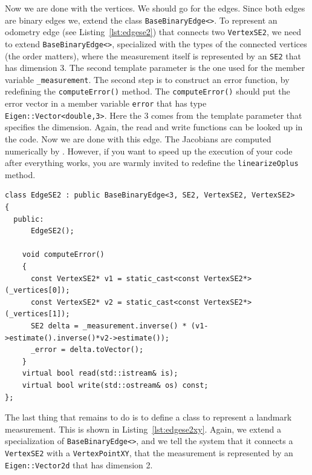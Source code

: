 \documentclass[a4paper]{article}
\begin{document}
Now we are done with the vertices. We should go for the edges.  Since
both edges are binary edges we, extend the class
\verb+BaseBinaryEdge<>+.
To represent an odometry edge (see Listing~\ref{lst:edgese2}) that
connects two \verb+VertexSE2+, we need to extend
\verb+BaseBinaryEdge<>+,  specialized with the types of the
connected vertices (the order matters), where the measurement itself
is represented by an \verb+SE2+ that has dimension 3. The second
template parameter is the one used for the member variable
\verb+_measurement+.  The second step is to construct an error
function, by redefining the \verb+computeError()+ method.  The
\verb+computeError()+ should put the error vector in a member variable
\verb+error+ that has type \verb+Eigen::Vector<double,3>+. Here the 3
comes from the template parameter that specifies the dimension.
Again, the read and write functions can be looked up in the code.
Now we are done with this edge. The Jacobians are computed numerically
by \gopt{}.  However, if you want to speed up the execution of your
code after everything works, you are warmly invited to redefine the
\verb+linearizeOplus+ method.

\begin{lstlisting}[float,label=lst:edgese2,caption=\text{Edge connecting two
  robot poses, for example, the odometry of the robot.}]
class EdgeSE2 : public BaseBinaryEdge<3, SE2, VertexSE2, VertexSE2>
{
  public:
      EdgeSE2();

    void computeError()
    {
      const VertexSE2* v1 = static_cast<const VertexSE2*>(_vertices[0]);
      const VertexSE2* v2 = static_cast<const VertexSE2*>(_vertices[1]);
      SE2 delta = _measurement.inverse() * (v1->estimate().inverse()*v2->estimate());
      _error = delta.toVector();
    }
    virtual bool read(std::istream& is);
    virtual bool write(std::ostream& os) const;
};
\end{lstlisting}

The last thing that remains to do is to define a class to represent a
landmark measurement.  This is shown in Listing~\ref{lst:edgese2xy}.
Again, we extend a specialization of \verb+BaseBinaryEdge<>+, and we
tell the system that it connects a \verb+VertexSE2+ with a
\verb+VertexPointXY+, that the measurement is represented by an
\verb+Eigen::Vector2d+ that has dimension 2.
\end{document}
